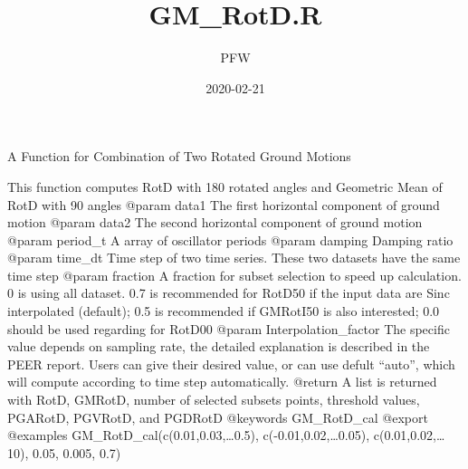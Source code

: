\documentclass[]{article}
\title{GM\_RotD.R}
\author{PFW}
\date{2020-02-21}
\begin{document}
\maketitle

A Function for Combination of Two Rotated Ground Motions

This function computes RotD with 180 rotated angles and Geometric Mean
of RotD with 90 angles @param data1 The first horizontal component of
ground motion @param data2 The second horizontal component of ground
motion @param period\_t A array of oscillator periods @param damping
Damping ratio @param time\_dt Time step of two time series. These two
datasets have the same time step @param fraction A fraction for subset
selection to speed up calculation. 0 is using all dataset. 0.7 is
recommended for RotD50 if the input data are Sinc interpolated
(default); 0.5 is recommended if GMRotI50 is also interested; 0.0 should
be used regarding for RotD00 @param Interpolation\_factor The specific
value depends on sampling rate, the detailed explanation is described in
the PEER report. Users can give their desired value, or can use defult
``auto'', which will compute  according to
time step automatically. @return A list is returned with RotD, GMRotD,
number of selected subsets points, threshold values, PGARotD, PGVRotD,
and PGDRotD @keywords GM\_RotD\_cal @export @examples
GM\_RotD\_cal(c(0.01,0.03,\ldots{}0.5), c(-0.01,0.02,\ldots{}0.05),
c(0.01,0.02,\ldots{}10), 0.05, 0.005, 0.7)
\end{document}

